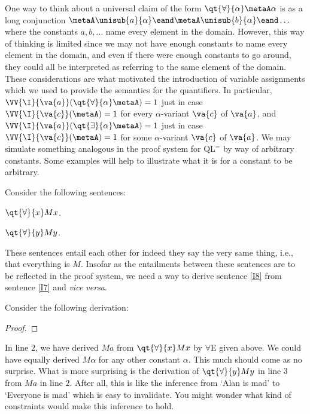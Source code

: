 One way to think about a universal claim of the form $\qt{\forall}{\alpha}\metaA\alpha$ is as a long conjunction $\metaA\unisub{a}{\alpha} \eand \metaA\unisub{b}{\alpha} \eand\ldots$ where the constants $a,b,\ldots$ name every element in the domain.
However, this way of thinking is limited since we may not have enough constants to name every element in the domain, and even if there were enough constants to go around, they could all be interpreted as referring to the same element of the domain.
These considerations are what motivated the introduction of variable assignments which we used to provide the semantics for the quantifiers.
In particular, $\VV{\I}{\va{a}}(\qt{\forall}{\alpha}\metaA)=1$ just in case $\VV{\I}{\va{c}}(\metaA)=1$ for every $\alpha$-variant $\va{c}$ of $\va{a}$, and $\VV{\I}{\va{a}}(\qt{\exists}{\alpha}\metaA)=1$ just in case $\VV{\I}{\va{c}}(\metaA)=1$ for some $\alpha$-variant $\va{c}$ of $\va{a}$.
We may simulate something analogous in the proof system for QL$^=$ by way of arbitrary constants.
Some examples will help to illustrate what it is for a constant to be arbitrary.

Consider the following sentences:

\begin{earg}
  \item[\ex{I7}] $\qt{\forall}{x} Mx$.
  \item[\ex{I8}] $\qt{\forall}{y} My$.
\end{earg}

These sentences entail each other for indeed they say the very same thing, i.e., that everything is $M$.
Insofar as the entailments between these sentences are to be reflected in the proof system, we need a way to derive sentence \ref{I8} from sentence \ref{I7} and \textit{vice versa}.

Consider the following derivation:

\begin{proof}
	 \pr{}
	 
	 
\end{proof}

In line $2$, we have derived $Ma$ from $\qt{\forall}{x}Mx$ by $\forall$E given above.
We could have equally derived $M\alpha$ for any other constant $\alpha$.
This much should come as no surprise.
What is more surprising is the derivation of $\qt{\forall}{y}My$ in line $3$ from $Ma$ in line $2$.
After all, this is like the inference from `Alan is mad' to `Everyone is mad' which is easy to invalidate.
You might wonder what kind of constraints would make this inference to hold.

